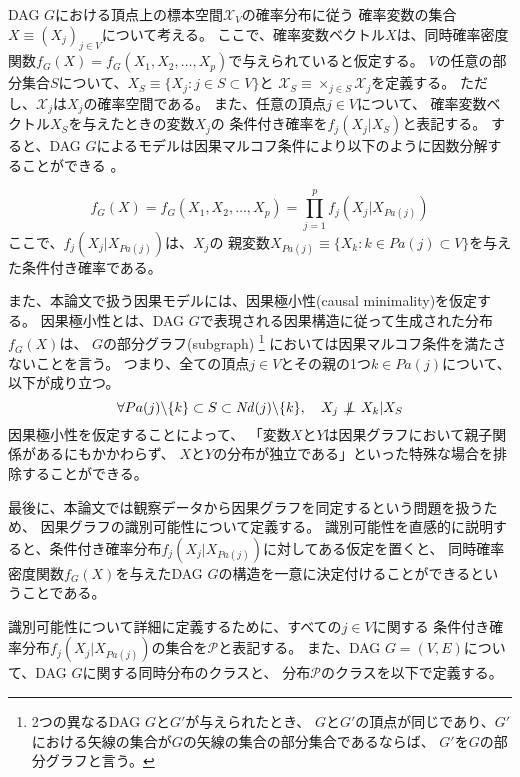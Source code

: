 DAG $G$における頂点上の標本空間$\mathcal X_V$の確率分布に従う
確率変数の集合$X \equiv (X_j)_{j \in V}$について考える。
ここで、確率変数ベクトル$X$は、同時確率密度関数$f_G(X)=f_G(X_1, X_2, \dots, X_p)$で与えられていると仮定する。
$V$の任意の部分集合$S$について、$X_S \equiv \{X_j:j\in S \subset V \}$と
$\mathcal X_S \equiv \times_{j \in S} \mathcal X_j$を定義する。
ただし、$\mathcal X_j$は$X_j$の確率空間である。
また、任意の頂点$j\in V$について、
確率変数ベクトル$X_S$を与えたときの変数$X_j$の
条件付き確率を$f_j(X_j|X_S)$と表記する。
すると、DAG $G$によるモデルは因果マルコフ条件により以下のように因数分解することができる
\cite{Pearl2009-oh}。

\begin{equation}
  f_G(X)=f_G(X_1, X_2, \dots, X_p) = \prod_{j=1}^p f_j(X_j | X_{Pa(j)})
  \label{eq:factorization}
\end{equation}
ここで、$f_j(X_j | X_{Pa(j)})$は、$X_j$の
親変数$X_{Pa(j)} \equiv \{ X_k:k\in Pa(j) \subset V \}$を与えた条件付き確率である。

また、本論文で扱う因果モデルには、因果極小性(causal minimality)を仮定する。
因果極小性とは、DAG $G$で表現される因果構造に従って生成された分布$f_G(X)$は、
$G$の部分グラフ(subgraph)
\footnote{2つの異なるDAG $G$と$G'$が与えられたとき、
$G$と$G'$の頂点が同じであり、$G'$における矢線の集合が$G$の矢線の集合の部分集合であるならば、
$G'$を$G$の部分グラフと言う\cite{Zhang2011-da}。}
においては因果マルコフ条件を満たさないことを言う\cite{Zhang2011-da}。
つまり、全ての頂点$j \in V$とその親の1つ$k \in Pa(j)$について、以下が成り立つ。
\begin{equation}
  \forall Pa(j)\backslash\{k\} \subset S \subset \mathit{Nd}(j) \backslash\{k\},
  \quad X_j \notindep X_k | X_S
  \label{minimality}
\end{equation}
因果極小性を仮定することによって、
「変数$X$と$Y$は因果グラフにおいて親子関係があるにもかかわらず、
$X$と$Y$の分布が独立である」といった特殊な場合を排除することができる。

最後に、本論文では観察データから因果グラフを同定するという問題を扱うため、
因果グラフの識別可能性について定義する。
識別可能性を直感的に説明すると、条件付き確率分布$f_j(X_j|X_{Pa(j)})$に対してある仮定を置くと、
同時確率密度関数$f_G(X)$を与えたDAG $G$の構造を一意に決定付けることができるということである。

識別可能性について詳細に定義するために、すべての$j \in V$に関する
条件付き確率分布$f_j(X_j|X_{Pa(j)})$の集合を$\mathcal P$と表記する。
また、DAG $G=(V,E)$について、DAG $G$に関する同時分布のクラスと、
分布$\mathcal P$のクラスを以下で定義する。

